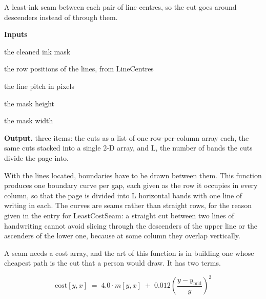 A least-ink seam between each pair of line centres, so the cut goes around descenders instead of through them.




\noindent\textbf{Inputs}
\begin{description}[leftmargin=2.2em,style=nextline,font=\normalfont\ttfamily]\setlength\itemsep{1pt}
  \item[{mask}] \normalfont the cleaned ink mask
  \item[{centres}] \normalfont the row positions of the lines, from LineCentres
  \item[{P}] \normalfont the line pitch in pixels
  \item[{H}] \normalfont the mask height
  \item[{W}] \normalfont the mask width
\end{description}

\noindent\textbf{Output.} three items: the cuts as a list of one row-per-column array each, the same cuts stacked into a single 2-D array, and L, the number of bands the cuts divide the page into.


With the lines located, boundaries have to be drawn between them. This function produces one boundary curve per gap, each given as the row it occupies in every column, so that the page is divided into L horizontal bands with one line of writing in each. The curves are seams rather than straight rows, for the reason given in the entry for LeastCostSeam: a straight cut between two lines of handwriting cannot avoid slicing through the descenders of the upper line or the ascenders of the lower one, because at some column they overlap vertically.


A seam needs a cost array, and the art of this function is in building one whose cheapest path is the cut that a person would draw. It has two terms.


\begin{equation}
\mathrm{cost}[y,x] \;=\; 4.0 \cdot m[y,x] \;+\; 0.012 \left(\frac{y - y_{\mathrm{mid}}}{g}\right)^{\!2}
\end{equation}

